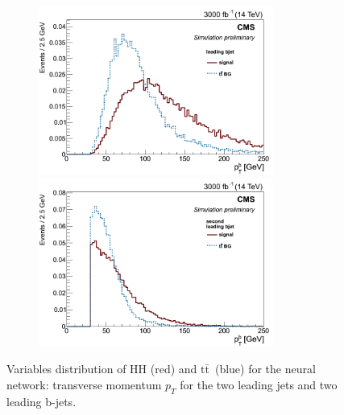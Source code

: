 \documentclass[10pt,a4paper]{article}
\newcommand{\ww}{7.7cm} %
\newcommand{\dd}{-2mm} %
\renewcommand{\tt}{$\text{t}\bar{\text{t}}$}
\begin{document}
\begin{figure}[h]
  \begin{subfigure}[b]{17cm}
    \begin{minipage}[h!]{\ww}
      \centering
      \includegraphics[width=\ww]{figs/bjet1Pt.png}
    \end{minipage}
    \begin{minipage}[h!]{\ww}
      \centering
      \includegraphics[width=\ww]{figs/bjet2Pt.png}
    \end{minipage}
  \end{subfigure}	
  \vspace{\dd}
  \caption{Variables distribution of HH (red) and \tt\ (blue) for the neural network: transverse momentum $p_T$ for the two leading jets and two leading b-jets.} \label{vars2}

\end{figure}
\end{document}
